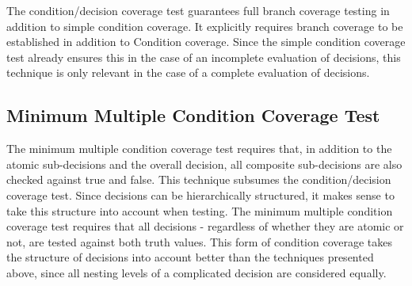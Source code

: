 \documentclass[master,english,smartquotes,apa]{hgbthesis}
\begin{document}
	The condition/decision coverage test guarantees full branch coverage testing in addition to simple condition coverage. It explicitly requires branch coverage to be established in addition to Condition coverage. Since the simple condition coverage test already ensures this in the case of an incomplete evaluation of decisions, this technique is only relevant in the case of a complete evaluation of decisions. %


	\subsection{Minimum Multiple Condition Coverage Test}
	The minimum multiple condition coverage test requires that, in addition to the atomic sub-decisions and the overall decision, all composite sub-decisions are also checked against true and false. This technique subsumes the condition/decision coverage test. Since decisions can be hierarchically structured, it makes sense to take this structure into account when testing. The minimum multiple condition coverage test requires that all decisions - regardless of whether they are atomic or not, are tested against both truth values. This form of condition coverage takes the structure of decisions into account better than the techniques presented above, since all nesting levels of a complicated decision are considered equally.
\end{document}
